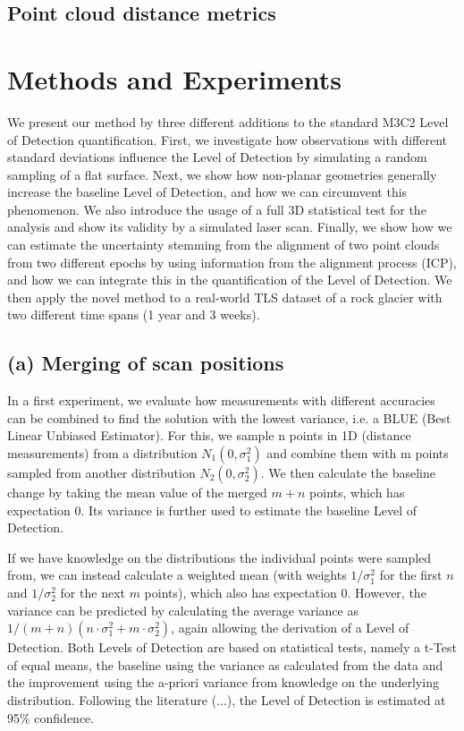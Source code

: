 \documentclass[preprint,12pt,3p]{elsarticle}
\begin{document}
\subsection{Point cloud distance metrics}


\section{Methods and Experiments}
\label{sec:methods}

We present our method by three different additions to the standard M3C2 Level of Detection quantification. First, we investigate how observations with different standard deviations influence the Level of Detection by simulating a random sampling of a flat surface. Next, we show how non-planar geometries generally increase the baseline Level of Detection, and how we can circumvent this phenomenon. We also introduce the usage of a full 3D statistical test for the analysis and show its validity by a simulated laser scan. Finally, we show how we can estimate the uncertainty stemming from the alignment of two point clouds from two different epochs by using information from the alignment process (ICP), and how we can integrate this in the quantification of the Level of Detection. We then apply the novel method to a real-world TLS dataset of a rock glacier with two different time spans (1 year and 3 weeks).

\subsection{(a) Merging of scan positions}
In a first experiment, we evaluate how measurements with different accuracies can be combined to find the solution with the lowest variance, i.e. a BLUE (Best Linear Unbiased Estimator). For this, we sample n points in 1D (distance measurements) from a distribution $N_1 (0, \sigma_1^2)$ and combine them with m points sampled from another distribution $N_2(0, \sigma_2^2)$. We then calculate the baseline change by taking the mean value of the merged $m+n$ points, which has expectation 0. Its variance is further used to estimate the baseline Level of Detection. 

If we have knowledge on the distributions the individual points were sampled from, we can instead calculate a weighted mean (with weights $1/\sigma_1^2$ for the first $n$ and $1/\sigma_2^2$ for the next $m$ points), which also has expectation 0. However, the variance can be predicted by calculating the average variance as $1/(m+n) (n\cdot\sigma_1^2 + m\cdot\sigma_2^2)$, again allowing the derivation of a Level of Detection.
Both Levels of Detection are based on statistical tests, namely a t-Test of equal means, the baseline using the variance as calculated from the data and the improvement using the a-priori variance from knowledge on the underlying distribution. Following the literature (...), the Level of Detection is estimated at 95\% confidence. 
\end{document}
